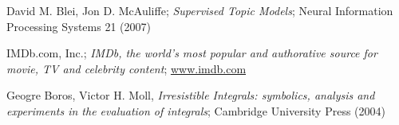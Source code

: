 \documentclass[a4paper,10pt]{article}
\begin{document}
\renewcommand{\refname}{\subsubsection*{References}} %
\begin{thebibliography}{9}
  David M. Blei, Jon D. McAuliffe;
  \emph{Supervised Topic Models};
  Neural Information Processing Systems 21 (2007)
  
  IMDb.com, Inc.; 
  \emph{IMDb, the world's most popular and authorative source for movie, TV and celebrity content};
  \url{www.imdb.com}

  Geogre Boros, Victor H. Moll,
  \emph{Irresistible Integrals: symbolics, analysis and experiments in the evaluation of integrals};
  Cambridge University Press (2004)

\end{thebibliography}
\end{document}
